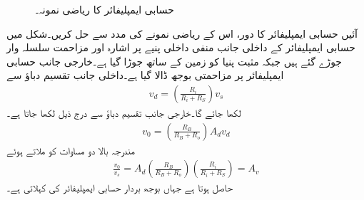 \begin{figure}
\centering
{}
\caption{حسابی ایمپلیفائر کا ریاضی نمونہ۔}
\label{شکل_حسابی_نمونہ}
\end{figure}    
آئیں حسابی ایمپلیفائر کا دور، اس کے ریاضی نمونے کی مدد سے حل کریں۔شکل  میں حسابی ایمپلیفائر کے داخلی جانب منفی داخلی پنیے پر  اشارہ  اور مزاحمت  سلسلہ وار جوڑے گئے ہیں جبکہ مثبت پنیا کو زمین کے ساتھ جوڑا گیا ہے۔خارجی جانب حسابی ایمپلیفائر پر مزاحمتی بوجھ  ڈالا گیا ہے۔داخلی جانب تقسیم دباؤ سے
\begin{align*}
v_d=\left(\frac{R_i}{R_i+R_S}\right)v_s
\end{align*}
لکھا جائے گا۔خارجی جانب تقسیم دباؤ سے درج ذیل لکھا جاتا ہے۔
\begin{align*}
v_0=\left(\frac{R_B}{R_B+R_o}\right) A_d v_d
\end{align*}
 مندرجہ بالا دو مساوات کو ملاتے ہوئے
\begin{align}\label{مساوات_حسابی_افزائش_الف}
\frac{v_0}{v_s}= A_d \left(\frac{R_B}{R_B+R_o}\right)\left(\frac{R_i}{R_i+R_S}\right)=A_v
\end{align}
حاصل ہوتا ہے جہاں  بوجھ بردار حسابی ایمپلیفائر کی  کہلاتی ہے۔ 
